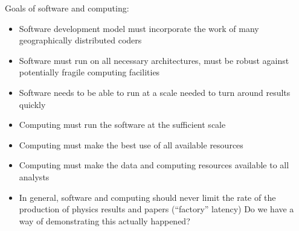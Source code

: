 \documentclass [draft,notitlepage] {article}
\begin{document}
Goals of software and computing:

\begin{itemize}
\item Software development model must incorporate the work of many geographically distributed coders
\item Software must run on all necessary architectures, must be robust against potentially fragile computing facilities
\item Software needs to be able to run at a scale needed to turn around results quickly
\item Computing must run the software at the sufficient scale
\item Computing must make the best use of all available resources
\item Computing must make the data and computing resources available to all analysts
\item In general, software and computing should never limit the rate of the production of physics results and papers (``factory'' latency) Do we have a way of demonstrating this actually happened?
\end{itemize}
\end{document}
